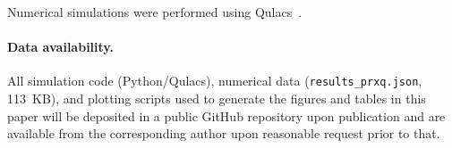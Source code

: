 \documentclass[prx,twocolumn,superscriptaddress,longbibliography,floatfix]{revtex4-2}
\begin{document}
\begin{acknowledgments}
Numerical simulations were performed using
Qulacs~\cite{Suzuki2021qulacs}.
\end{acknowledgments}

\paragraph*{Data availability.}
All simulation code (Python/Qulacs), numerical data (\texttt{results\_prxq.json}, 113~KB), and plotting scripts used to generate the figures and tables in this paper will be deposited in a public GitHub repository upon publication and are available from the corresponding author upon reasonable request prior to that.



\end{document}
